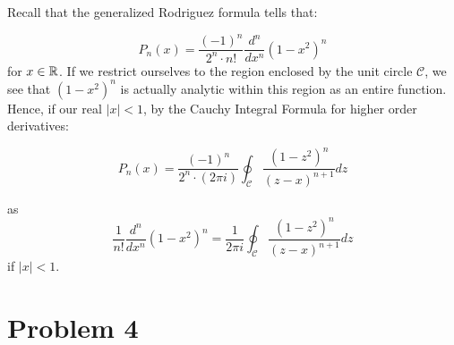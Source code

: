 \documentclass[12pt]{article}%
\newcommand{\C}{\mathcal{C}}
\begin{document}
Recall that the generalized Rodriguez formula tells that:

\[ P_n(x) = \frac{(-1)^n}{2^n
\cdot n!}\frac{d^n}{dx^n}(1- x^2)^n \] for $x \in {\mathbb{R}}$. If we restrict ourselves to the region enclosed by the unit circle $\C$, we see that $(1-x^2)^n$ is actually analytic within this region as an entire function. Hence, if our real $|x| < 1$, by the Cauchy Integral Formula for higher order derivatives:

\[ P_n(x) = \frac{(-1)^n}{2^n
\cdot (2 \pi i )} \oint_{\C} \frac{(1 - z^2)^n}{(z - x)^{n+1}} dz \]

as \[ \frac{1}{n!}\frac{d^n}{dx^n}(1- x^2)^n =  \frac{1}{2\pi i} \oint_{\C} \frac{(1 - z^2)^n}{(z - x)^{n+1}}  dz \] if $|x| < 1$.

\section{Problem 4}
\end{document}
